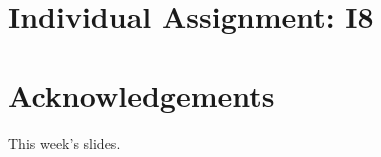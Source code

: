 \documentclass{article}
\begin{document}
\section{Individual Assignment: I8}\label{sec:i8}


\clearpage

\section*{Acknowledgements}
This week's slides.

% 
% 

\clearpage

\end{document}
